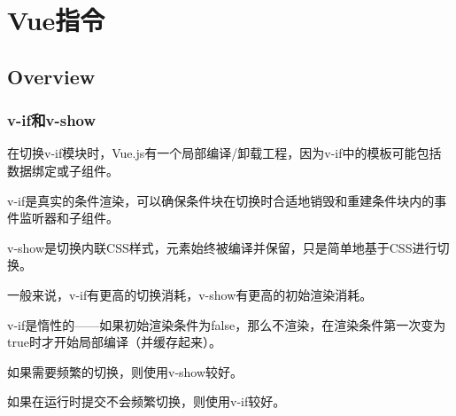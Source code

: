 \part{Vue指令}


\chapter{Overview}


\section{v-if和v-show}

在切换v-if模块时，Vue.js有一个局部编译/卸载工程，因为v-if中的模板可能包括数据绑定或子组件。

\begin{compactitem}
\item v-if是真实的条件渲染，可以确保条件块在切换时合适地销毁和重建条件块内的事件监听器和子组件。
\item v-show是切换内联CSS样式，元素始终被编译并保留，只是简单地基于CSS进行切换。
\end{compactitem}

一般来说，v-if有更高的切换消耗，v-show有更高的初始渲染消耗。

v-if是惰性的——如果初始渲染条件为false，那么不渲染，在渲染条件第一次变为true时才开始局部编译（并缓存起来）。

\begin{compactitem}
\item 如果需要频繁的切换，则使用v-show较好。
\item 如果在运行时提交不会频繁切换，则使用v-if较好。
\end{compactitem}


\begin{lstlisting}[language=JavaScript]

\end{lstlisting}



\begin{lstlisting}[language=JavaScript]

\end{lstlisting}




\begin{lstlisting}[language=JavaScript]

\end{lstlisting}




\begin{lstlisting}[language=JavaScript]

\end{lstlisting}




